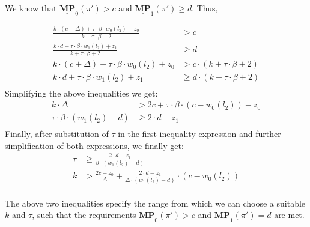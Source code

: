 \noindent We know that $\underline{\mathbf{MP}}_0(\pi') > c$ and $\underline{\mathbf{MP}}_1(\pi') \geqslant d$. Thus,

\begin{align*}
    \frac{k\cdot(c+\Delta) + \tau \cdot \beta \cdot w_0(l_2) + z_0}{k + \tau\cdot\beta + 2} &> c\\
    \frac{k\cdot d + \tau \cdot \beta \cdot w_1(l_2) + z_1}{k + \tau\cdot\beta + 2} &\geqslant d\\
    k\cdot(c+\Delta) + \tau \cdot \beta \cdot w_0(l_2) + z_0 &> c \cdot (k + \tau\cdot\beta + 2)\\
    k\cdot d + \tau \cdot \beta \cdot w_1(l_2) + z_1 &\geqslant d \cdot (k + \tau\cdot\beta + 2)\\
\end{align*}
Simplifying the above inequalities we get:
\begin{align*}
    k\cdot\Delta &> 2c + \tau \cdot \beta \cdot (c - w_0(l_2)) - z_0 \\
    \tau \cdot \beta \cdot (w_1(l_2) - d) &\geqslant 2\cdot d - z_1 \\
\end{align*}
Finally, after substitution of $\tau$ in the first inequality expression and further simplification of both expressions, we finally get:
\begin{align*}
    \tau &\geqslant \frac{2\cdot d - z_1}{\beta \cdot (w_1(l_2) - d)}\\
    k &> \frac{2c - z_0}{\Delta} +  \frac{2\cdot d - z_1} {\Delta \cdot (w_1(l_2) - d)} \cdot (c - w_0(l_2)) \\
\end{align*}

\noindent The above two inequalities specify the range from which we can choose a suitable $k$ and $\tau$, such that the requirements $\underline{\mathbf{MP}}_0(\pi') > c$ and $\underline{\mathbf{MP}}_1(\pi') = d$ are met.
